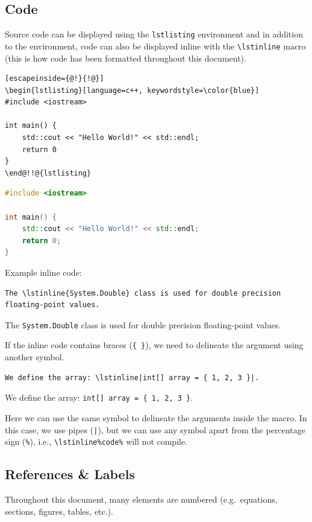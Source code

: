 \documentclass[11pt, twoside]{article}
\begin{document}
\subsection{Code}
Source code can be displayed using the \lstinline{lstlisting} environment and in addition to the environment,
code can also be displayed inline with the \lstinline{\lstinline} macro (this is how code has been formatted throughout this document).
\begin{lstlisting}[escapeinside={@!}{!@}]
\begin{lstlisting}[language=c++, keywordstyle=\color{blue}]
#include <iostream>

int main() {
    std::cout << "Hello World!" << std::endl;
    return 0
}
\end@!!@{lstlisting}
\end{lstlisting}
\begin{outputbox}
    \begin{lstlisting}[language=c++,keywordstyle=\color{blue}]
#include <iostream>

int main() {
    std::cout << "Hello World!" << std::endl;
    return 0;
}
\end{lstlisting}
\end{outputbox}
Example inline code:
\begin{lstlisting}
The \lstinline{System.Double} class is used for double precision floating-point values.
\end{lstlisting}
\begin{outputbox}
    The \lstinline{System.Double} class is used for double precision floating-point values.
\end{outputbox}
If the inline code contains braces (\lstinline|{ }|), we need to delineate the argument using another symbol.
\begin{lstlisting}
We define the array: \lstinline|int[] array = { 1, 2, 3 }|.
\end{lstlisting}
\begin{outputbox}
    We define the array: \lstinline|int[] array = { 1, 2, 3 }|.
\end{outputbox}
Here we can use the same symbol to delineate the arguments inside the macro. In this case, we use pipes (\lstinline{|}), but we can use any symbol apart from the percentage sign (\lstinline|%|), i.e., \lstinline|\lstinline%code%| will not compile.
\subsection{References \& Labels}
Throughout this document, many elements are numbered (e.g.\ equations, sections, figures, tables, etc.).
\end{document}
